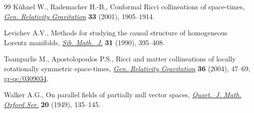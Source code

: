 \begin{thebibliography}{99}
K{\"u}hnel W., Rademacher H.-B., Conformal {R}icci collineations of space-times,
 \href{http://dx.doi.org/10.1023/A:1013091621037}{\textit{Gen. Relativity Gravitation}} \textbf{33} (2001), 1905--1914.

Levichev A.V., Methods for studying the causal structure of homogeneous
 {L}orentz manifolds, \href{http://dx.doi.org/10.1007/BF00970346}{\textit{Sib. Math.~J.}} \textbf{31} (1990), 395--408.

Tsamparlis M., Apostolopoulos P.S., Ricci and matter collineations of locally
 rotationally symmetric space-times, \href{http://dx.doi.org/10.1023/B:GERG.0000006693.75816.e9}{\textit{Gen. Relativity Gravitation}}
 \textbf{36} (2004), 47--69, \href{http://arxiv.org/abs/gr-qc/0309034}{gr-qc/0309034}.

Walker A.G., On parallel f\/ields of partially null vector spaces,
 \href{http://dx.doi.org/10.1093/qmath/os-20.1.135}{\textit{Quart.~J. Math. Oxford Ser.}} \textbf{20} (1949), 135--145.

\end{thebibliography}

